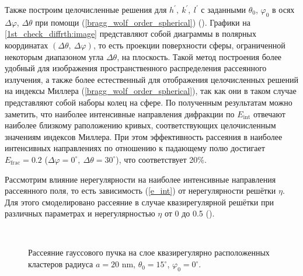 Также построим целочисленные решения для $h^\prime,\:k^\prime,\:l^\prime$ с заданными $\theta_0$, $\varphi_0$ в осях $\Delta \varphi$, $\Delta \theta$ при помощи (\ref{bragg_wolf_order_spherical}) (). Графики на \autoref{1st_check_diffrth:image} представляют собой диаграммы в полярных координатах $(\Delta \theta, \: \Delta \varphi)$, то есть проекции поверхности сферы, ограниченной некоторым диапазоном угла $\Delta \theta$, на плоскость. Такой метод построения более удобный для изображения пространственного распределения рассеянного излучения, а также более естественный для отображения целочисленных решений на индексы Миллера (\ref{bragg_wolf_order_spherical}), так как они в таком случае представляют собой наборы колец на сфере. По полученным результатам можно заметить, что наиболее интенсивные направления дифракции по $E_{\textrm{int}}$ отвечают наиболее близкому раположению кривых, соответствующих целочисленным значениям индексов Миллера. При этом эффективность рассеяния в наиболее интенсивных направлениях по отношению к падающему полю достигает $E_{\textrm{frac}} = 0.2$ ($\Delta \varphi = 0^\circ,\: \Delta \theta = 30^\circ$), что соответствует 20\%.

Рассмотрим влияние нерегулярности на наиболее интенсивные направления рассеянного поля, то есть зависимость (\ref{e_int}) от нерегулярности решётки $\eta$. Для этого смоделировано рассеяние в случае квазирегулярной решётки при различных параметрах и нерегулярностью $\eta$ от 0 до 0.5 ().


    \begin{figure}[H]

        \hfil
        \\
        \caption{Рассеяние гауссового пучка на слое квазирегулярно расположенных кластеров радиуса $a = 20$ nm, $\theta_0 = 15^{\circ}$, $\varphi_0 = 0^{\circ}$.}\label{nonreg_ka0.7:image}
    \end{figure}

